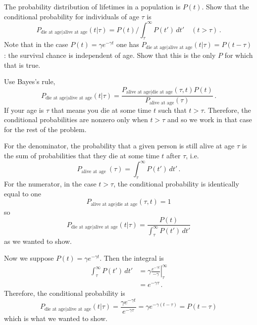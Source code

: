 

The probability distribution of lifetimes in a population is $P(t)$.
Show that the conditional probability for individuals of age $\tau$ is
\begin{equation*}
  P_{\text{die at age}|\text{alive at age}}(t | \tau) = P(t) / \int_\tau^\infty P(t') \, dt' \quad (t > \tau)
  \, .
\end{equation*}
Note that in the case $P(t) = \gamma e^{-\gamma t}$ one has $P_{\text{die at age}|\text{alive at age}}(t|\tau) = P(t - \tau)$: the survival chance is independent of age.
Show that this is the only $P$ for which that is true.


Use Bayes's rule,
\begin{equation*}
  P_{\text{die at age}|\text{alive at age}}(t | \tau)
  = \frac{P_{\text{alive at age}|\text{die at age}}(\tau, t)P(t)}{P_{\text{alive at age}}(\tau)}
  \, .
\end{equation*}
If your age is $\tau$ that means you die at some time $t$ such that $t > \tau$.
Therefore, the conditional probabilities are nonzero only when $t > \tau$ and so we work in that case for the rest of the problem.

For the denominator, the probability that a given person is still alive at age $\tau$ is the sum of probabilities that they die at some time $t$ after $\tau$, i.e.
\begin{equation*}
  P_\text{alive at age }(\tau) = \int_\tau^\infty P(t') \, dt'
  \, .
\end{equation*}
For the numerator, in the case $t > \tau$, the conditional probability is identically equal to one
\begin{displaymath}
  P_{\text{alive at age}|\text{die at age}}(\tau, t) = 1
\end{displaymath}
so
\begin{equation*}
  P_{\text{die at age}|\text{alive at age}}(t | \tau)
  = \frac{P(t)}{\int_\tau^\infty P(t') \, dt'}
\end{equation*}
as we wanted to show.

Now we suppose $P(t) = \gamma e^{-\gamma t}$.
Then the integral is
\begin{align*}
  \int_\tau^\infty P(t') \, dt'
  &= \gamma \left. \frac{e^{-\gamma t}}{-\gamma} \right|_\tau^\infty \\
  &= e^{-\gamma \tau}
  \, .
\end{align*}
Therefore, the conditional probability is
\begin{equation*}
  P_{\text{die at age}|\text{alive at age}}(t | \tau)
  = \frac{\gamma e^{-\gamma t}}{e^{-\gamma \tau}} = \gamma e^{-\gamma (t - \tau)}
  = P( t - \tau)
\end{equation*}
which is what we wanted to show.

